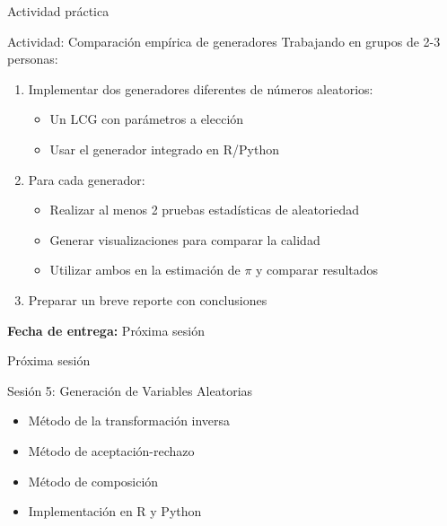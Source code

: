 \documentclass[aspectratio=169]{beamer}
\begin{document}
\begin{frame}{Actividad práctica}
    \begin{exampleblock}{Actividad: Comparación empírica de generadores}
        Trabajando en grupos de 2-3 personas:
        \begin{enumerate}
            \item Implementar dos generadores diferentes de números aleatorios:
            \begin{itemize}
                \item Un LCG con parámetros a elección
                \item Usar el generador integrado en R/Python
            \end{itemize}
            \item Para cada generador:
            \begin{itemize}
                \item Realizar al menos 2 pruebas estadísticas de aleatoriedad
                \item Generar visualizaciones para comparar la calidad
                \item Utilizar ambos en la estimación de $\pi$ y comparar resultados
            \end{itemize}
            \item Preparar un breve reporte con conclusiones
        \end{enumerate}
        
        \textbf{Fecha de entrega:} Próxima sesión
    \end{exampleblock}
\end{frame}

\begin{frame}{Próxima sesión}
    \begin{block}{Sesión 5: Generación de Variables Aleatorias}
        \begin{itemize}
            \item Método de la transformación inversa
            \item Método de aceptación-rechazo
            \item Método de composición
            \item Implementación en R y Python
        \end{itemize}
    \end{block}
    
\end{frame}
\end{document}
